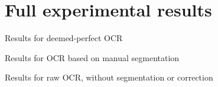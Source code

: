 \section{Full experimental results}\label{appdx:full-results}

\begin{table}[htbp]
\centering
\begin{adjustbox}{width=\textwidth, center}

\end{adjustbox}
\caption{Results for deemed-perfect OCR}
\label{tab:summary}
\end{table}


\begin{table}[htbp]
\centering
\begin{adjustbox}{width=\textwidth, center}

\end{adjustbox}
\caption{Results for OCR based on manual segmentation}
\label{tab:summary}
\end{table}

\begin{table}[htbp]
\centering
\begin{adjustbox}{width=\textwidth, center}

\end{adjustbox}
\caption{Results for raw OCR, without segmentation or correction}
\label{tab:summary}
\end{table}


\begin{comment}
\section{Full data schema}
TODO indiquer modèle avec la gestion des renvois
\joel{Le modèle est déjà complet dans l'article }
\end{comment}